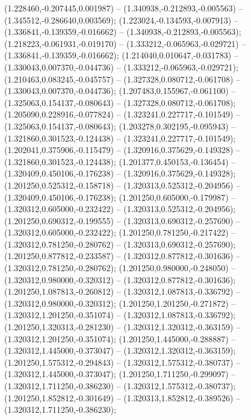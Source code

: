  (1.228460,-0.207445,0.001987) -- (1.340938,-0.212893,-0.005563) -- (1.345512,-0.286640,0.003569);
 (1.223024,-0.134593,-0.007913) -- (1.336841,-0.139359,-0.016662) -- (1.340938,-0.212893,-0.005563);
 (1.218223,-0.061931,-0.019170) -- (1.333212,-0.065963,-0.029721) -- (1.336841,-0.139359,-0.016662);
 (1.214040,0.010647,-0.031783) -- (1.330043,0.007370,-0.044736) -- (1.333212,-0.065963,-0.029721);
 (1.210463,0.083245,-0.045757) -- (1.327328,0.080712,-0.061708) -- (1.330043,0.007370,-0.044736);
 (1.207483,0.155967,-0.061100) -- (1.325063,0.154137,-0.080643) -- (1.327328,0.080712,-0.061708);
 (1.205090,0.228916,-0.077824) -- (1.323241,0.227717,-0.101549) -- (1.325063,0.154137,-0.080643);
 (1.203278,0.302195,-0.095943) -- (1.321860,0.301523,-0.124438) -- (1.323241,0.227717,-0.101549);
 (1.202041,0.375906,-0.115479) -- (1.320916,0.375629,-0.149328) -- (1.321860,0.301523,-0.124438);
 (1.201377,0.450153,-0.136454) -- (1.320409,0.450106,-0.176238) -- (1.320916,0.375629,-0.149328);
 (1.201250,0.525312,-0.158718) -- (1.320313,0.525312,-0.204956) -- (1.320409,0.450106,-0.176238);
 (1.201250,0.605000,-0.179987) -- (1.320312,0.605000,-0.232422) -- (1.320313,0.525312,-0.204956);
 (1.201250,0.690312,-0.199555) -- (1.320313,0.690312,-0.257690) -- (1.320312,0.605000,-0.232422);
 (1.201250,0.781250,-0.217422) -- (1.320312,0.781250,-0.280762) -- (1.320313,0.690312,-0.257690);
 (1.201250,0.877812,-0.233587) -- (1.320312,0.877812,-0.301636) -- (1.320312,0.781250,-0.280762);
 (1.201250,0.980000,-0.248050) -- (1.320312,0.980000,-0.320312) -- (1.320312,0.877812,-0.301636);
 (1.201250,1.087813,-0.260812) -- (1.320312,1.087813,-0.336792) -- (1.320312,0.980000,-0.320312);
 (1.201250,1.201250,-0.271872) -- (1.320312,1.201250,-0.351074) -- (1.320312,1.087813,-0.336792);
 (1.201250,1.320313,-0.281230) -- (1.320312,1.320312,-0.363159) -- (1.320312,1.201250,-0.351074);
 (1.201250,1.445000,-0.288887) -- (1.320312,1.445000,-0.373047) -- (1.320312,1.320312,-0.363159);
 (1.201250,1.575312,-0.294843) -- (1.320312,1.575312,-0.380737) -- (1.320312,1.445000,-0.373047);
 (1.201250,1.711250,-0.299097) -- (1.320312,1.711250,-0.386230) -- (1.320312,1.575312,-0.380737);
 (1.201250,1.852812,-0.301649) -- (1.320313,1.852812,-0.389526) -- (1.320312,1.711250,-0.386230);

